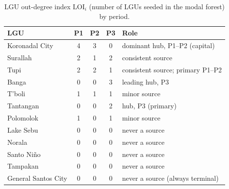 \documentclass[a4paper,11pt]{article}
\begin{document}
\begin{table}[htbp]
\centering
\caption{LGU out-degree index $\mathrm{LOI}_i$ (number of LGUs seeded in the modal
forest) by period.}
\label{tab:rc}
\small
\begin{tabular}{lcccl}
\toprule
\textbf{LGU} & \textbf{P1} & \textbf{P2} & \textbf{P3} & \textbf{Role} \\
\midrule
Koronadal City   & 4 & 3 & 0 & dominant hub, P1--P2 (capital) \\
Surallah         & 2 & 1 & 2 & consistent source \\
Tupi             & 2 & 2 & 1 & consistent source; primary P1--P2 \\
Banga            & 0 & 0 & 3 & leading hub, P3 \\
T'boli           & 1 & 1 & 1 & minor source \\
Tantangan        & 0 & 0 & 2 & hub, P3 (primary) \\
Polomolok        & 1 & 0 & 1 & minor source \\
Lake Sebu        & 0 & 0 & 0 & never a source \\
Norala           & 0 & 0 & 0 & never a source \\
Santo Ni\~{n}o   & 0 & 0 & 0 & never a source \\
Tampakan         & 0 & 0 & 0 & never a source \\
General Santos City & 0 & 0 & 0 & never a source (always terminal) \\
\bottomrule
\end{tabular}
\end{table}
\end{document}
